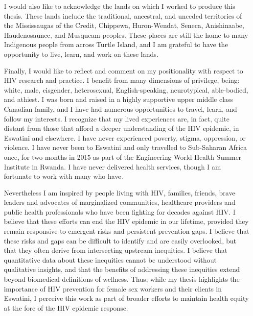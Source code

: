 \clearpage
I would also like to acknowledge the lands on which I worked to produce this thesis.
These lands include the traditional, ancestral, and unceded territories of the
Mississaugas of the Credit, Chippewa, Huron-Wendat, Seneca, %
Anishinaabe, Haudenosaunee, %
and Musqueam peoples. %
These places are still the home to many Indigenous people from across Turtle Island,
and I am grateful to have the opportunity to live, learn, and work on these lands.
\par
Finally, I would like to reflect and comment on my positionality with respect to HIV research and practice.
I benefit from many dimensions of privilege, being:
white, male, cisgender, heterosexual, English-speaking, neurotypical, able-bodied, and athiest.
I was born and raised in a highly supportive upper middle class Canadian family,
and I have had numerous opportunities to travel, learn, and follow my interests.
I recognize that my lived experiences are, in fact, quite distant from those that
afford a deeper understanding of the HIV epidemic, in Eswatini and elsewhere.
I have never experienced poverty, stigma, oppression, or violence.
I have never been to Eswatini and only travelled to Sub-Saharan Africa once,
for two months in 2015 as part of the Engineering World Health Summer Institute in Rwanda.
I have never delivered health services,
though I am fortunate to work with many who have.
\par
Nevertheless I am inspired by
people living with HIV, families, friends,
brave leaders and advocates of marginalized communities,
healthcare providers and public health professionals
who have been fighting for decades against HIV.
I believe that these efforts can end the HIV epidemic in our lifetime,
provided they remain responsive to emergent risks and persistent prevention gaps.
I believe that these risks and gaps can be difficult to identify and are easily overlooked,
but that they often derive from intersecting upstream inequities.
I believe that quantitative data about these inequities
cannot be understood without qualitative insights,
and that the benefits of addressing these inequities
extend beyond biomedical definitions of wellness.
Thus, while my thesis highlights the importance of
HIV prevention for female sex workers and their clients in Eswatini,
I perceive this work as part of broader efforts to
maintain health equity at the fore of the HIV epidemic response.
